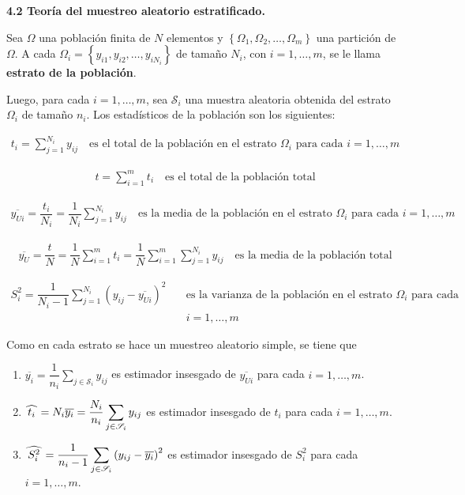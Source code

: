\documentclass[12pt, fleqn]{article}
\newcommand{\gorro}[1]{\widehat{\hspace{0.7mm} #1 \hspace{0.7mm}}}
\begin{document}
	\textbf{4.2 Teoría del muestreo aleatorio estratificado.}

	Sea $ \Omega $ una población finita de $ N $ elementos y $ \left\lbrace \Omega_1, \Omega_2, \ldots, \Omega_m \right\rbrace $ una partición de $ \Omega $. A cada $ \Omega_i = \left\lbrace y_{i1}, y_{i2}, \ldots, y_{i N_i} \right\rbrace $ de tamaño $ N_i $, con $ i = 1, \ldots, m $, se le llama \textbf{estrato de la población}.

    Luego, para cada $ i = 1, \ldots, m $, sea $ \mathcal{S}_i $ una muestra aleatoria obtenida del estrato $ \Omega_i $ de tamaño $ n_i $. Los estadísticos de la población son los siguientes:

    \begin{align*}
        t_i = \sum_{j=1}^{N_i} y_{ij} \quad \mbox{es el total de la población en el estrato } \Omega_i \mbox{ para cada } i = 1, \ldots, m
    \end{align*}

    \begin{align*}
        t = \sum_{i=1}^{m} t_i \quad \mbox{es el total de la población total}
    \end{align*}

    \begin{align*}
        \overline{y_{Ui}} = \dfrac{t_i}{N_i} = \dfrac{1}{N_i} \sum_{j=1}^{N_i} y_{ij} \quad \mbox{es la media de la población en el estrato } \Omega_i \mbox{ para cada } i = 1, \ldots, m
    \end{align*}

    \begin{align*}
        \overline{y_{U}} = \dfrac{t}{N} = \dfrac{1}{N} \sum_{i=1}^{m} t_i = \dfrac{1}{N} \sum_{i=1}^{m} \sum_{j=1}^{N_i} y_{ij} \quad \mbox{es la media de la población total}
    \end{align*}

    \begin{align*}
        S_i^2 = \dfrac{1}{N_i - 1} \sum_{j=1}^{N_i} \left( y_{ij} - \overline{y_{Ui}} \right)^2 \quad & \mbox{es la varianza de la población en el estrato } \Omega_i \mbox{ para cada } \\ & i = 1, \ldots, m
    \end{align*}

    Como en cada estrato se hace un muestreo aleatorio simple, se tiene que

    \begin{enumerate}
        \item $ \displaystyle \overline{y_i} = \dfrac{1}{n_i} \sum_{j \in \mathscr{S}_i} y_{ij} $ es estimador insesgado de $ \overline{y_{Ui}} $ para cada $ i = 1, \ldots, m $.
        \item $ \displaystyle \gorro{t_i} = N_i \overline{y_i} = \dfrac{N_i}{n_i} \sum_{j \in \mathscr{S}_i} y_{ij} $ es estimador insesgado de $ t_i $ para cada $ i = 1, \ldots, m $.
        \item $ \displaystyle \gorro{S_i^2} = \dfrac{1}{n_i - 1} \sum_{j \in \mathscr{S}_i} \left( y_{ij} - \overline{y_i} \right)^2 $ es estimador insesgado de $ S_i^2 $ para cada $ i = 1, \ldots, m $.
    \end{enumerate}
\end{document}
